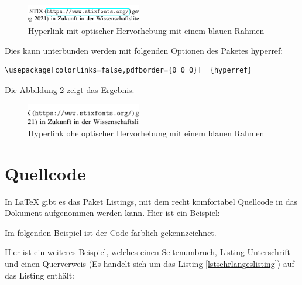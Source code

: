 \begin{figure}
\hfill{}\includegraphics[width=5cm]{figures/05_rahmenumlinks/mitrahmen}\hfill{}\null

\caption{Hyperlink mit optischer Hervorhebung mit einem blauen Rahmen}
\label{fig:linkmitrahmen}
\end{figure}

Dies kann unterbunden werden mit folgenden Optionen des Paketes hyperref:

\bgroup{}
\begin{lstlisting}
\usepackage[colorlinks=false,pdfborder={0 0 0}]  {hyperref}
\end{lstlisting}
\leavevmode\egroup

Die Abbildung \ref{fig:linkohnerahmen} zeigt das Ergebnis.

\begin{figure}
\hfill{}\includegraphics[width=5cm]{figures/05_rahmenumlinks/ohnerahmen}\hfill{}\null

\caption{Hyperlink ohe optischer Hervorhebung mit einem blauen Rahmen}
\label{fig:linkohnerahmen}
\end{figure}


\chapter{Quellcode}

In LaTeX gibt es das Paket Listings, mit dem recht komfortabel Quellcode
in das Dokument aufgenommen werden kann. Hier ist ein Beispiel: 



Im folgenden Beispiel ist der Code farblich gekennzeichnet.



Hier ist ein weiteres Beispiel, welches einen Seitenumbruch, Listing-Unterschrift
und einen Querverweis (Es handelt sich um das Listing \ref{lstsehrlangeslisting})
auf das Listing enthält:



